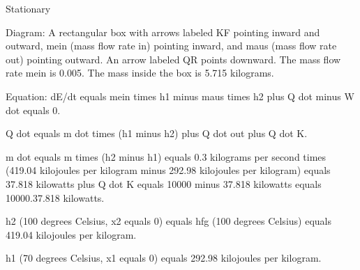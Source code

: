 Stationary

Diagram: A rectangular box with arrows labeled KF pointing inward and outward, mein (mass flow rate in) pointing inward, and maus (mass flow rate out) pointing outward. An arrow labeled QR points downward. The mass flow rate mein is 0.005. The mass inside the box is 5.715 kilograms.

Equation: 
dE/dt equals mein times h1 minus maus times h2 plus Q dot minus W dot equals 0.

Q dot equals m dot times (h1 minus h2) plus Q dot out plus Q dot K.

m dot equals m times (h2 minus h1) equals 0.3 kilograms per second times (419.04 kilojoules per kilogram minus 292.98 kilojoules per kilogram) equals 37.818 kilowatts plus Q dot K equals 10000 minus 37.818 kilowatts equals 10000.37.818 kilowatts.

h2 (100 degrees Celsius, x2 equals 0) equals hfg (100 degrees Celsius) equals 419.04 kilojoules per kilogram.

h1 (70 degrees Celsius, x1 equals 0) equals 292.98 kilojoules per kilogram.